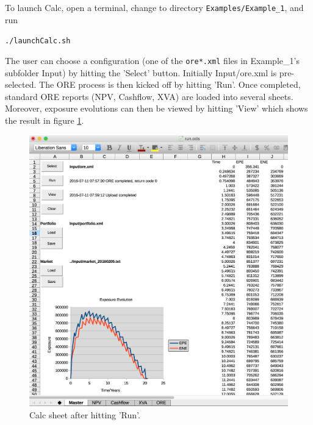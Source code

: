 \documentclass[12pt, a4paper]{article}
\begin{document}
To launch Calc, open a terminal, change to directory {\tt Examples/Example\_1}, and run

\medskip
{\centerline{\tt ./launchCalc.sh} }
\medskip

The user can choose a configuration (one of the {\tt ore*.xml} files in Example\_1's subfolder Input) by hitting the
'Select' button. Initially Input/ore.xml is pre-selected. The ORE process is then kicked off by hitting 'Run'. Once
completed, standard ORE reports (NPV, Cashflow, XVA) are loaded into several sheets. Moreover, exposure evolutions can
then be viewed by hitting 'View' which shows the result in figure \ref{fig_16}.  \\
\begin{figure}[h]
\begin{center}
\includegraphics[scale=0.4]{demo_calc_2}
\end{center}
\caption{Calc sheet after hitting 'Run'.}
\label{fig_16}
\end{figure}
\end{document}

